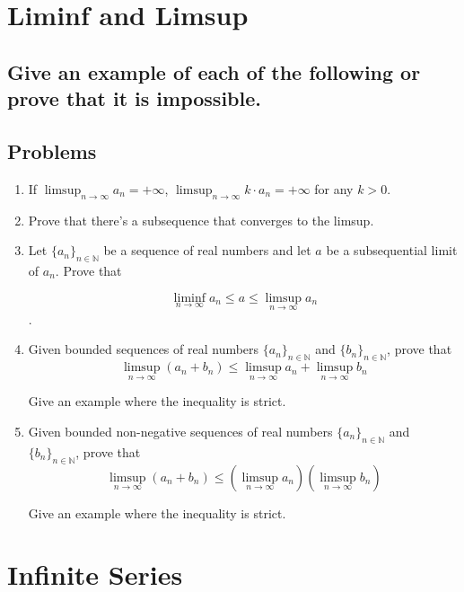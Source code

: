 \documentclass{article}
\theoremstyle{definition}
\begin{document}
\newpage

\section{Liminf and Limsup}

\subsection{Give an example of each of the following or prove that it is impossible.}

\subsection{Problems}

\begin{enumerate}
    \item If $\limsup_{n \to \infty} a_{n} = + \infty$, $\limsup_{n \to \infty} k \cdot a_{n} = + \infty$ for any $k > 0$.
    \item Prove that there's a subsequence that converges to the limsup.
    \item Let \( \{a_n\}_{n \in \mathbb{N}} \) be a sequence of real numbers and let $a$ be a subsequential limit of $a_{n}$. Prove that 
    
    \[ \liminf_{n \to \infty} a_{n} \leq a \leq  \limsup_{n \to \infty} a_{n}\].
    \item Given bounded sequences of real numbers \( \{a_n\}_{n \in \mathbb{N}} \) and \( \{b_n\}_{n \in \mathbb{N}} \), prove that
    \[
    \limsup_{n \to \infty} (a_n + b_n) \leq \limsup_{n \to \infty} a_n + \limsup_{n \to \infty} b_n
    \]

    Give an example where the inequality is strict.
    \item Given bounded non-negative sequences of real numbers \( \{a_n\}_{n \in \mathbb{N}} \) and \( \{b_n\}_{n \in \mathbb{N}} \), prove that
    \[
    \limsup_{n \to \infty} (a_n + b_n) \leq (\limsup_{n \to \infty} a_n)(\limsup_{n \to \infty} b_n)
    \]

    Give an example where the inequality is strict.

\end{enumerate}

\newpage

\section{Infinite Series}
\end{document}

